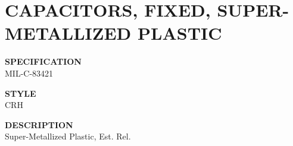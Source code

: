 \section{CAPACITORS, FIXED, SUPER-METALLIZED PLASTIC}

\begin{minipage}[t]{0.24\textwidth}
    \textbf{SPECIFICATION}\\
    MIL-C-83421
\end{minipage}
\hfill
\begin{minipage}[t]{0.12\textwidth}
    \textbf{STYLE}\\
    CRH
\end{minipage}
\hfill
\begin{minipage}[t]{0.61\textwidth}
    \textbf{DESCRIPTION}\\
    Super-Metallized Plastic, Est. Rel.
\end{minipage}

